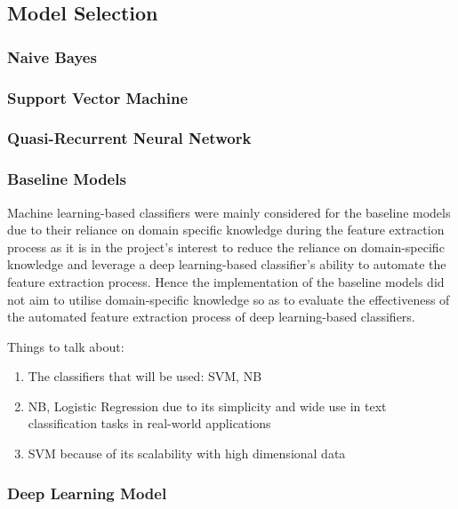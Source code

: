 \documentclass[a4paper,twoside,phd]{BYUPhys}
\begin{document}
\subsection{Model Selection}
\label{sec:ModelSelection}

\subsubsection{Naive Bayes}
\label{sec:ModelNB}

\subsubsection{Support Vector Machine}
\label{sec:ModelSVM}

\subsubsection{Quasi-Recurrent Neural Network}
\label{sec:ModelQRNN}


\subsubsection{Baseline Models}
\label{sec:BaselineModels}

Machine learning-based classifiers were mainly considered for the baseline models due to their reliance on domain specific knowledge during the feature extraction process as it is in the project's interest to reduce the reliance on domain-specific knowledge and leverage a deep learning-based classifier's ability to automate the feature extraction process. Hence the implementation of the baseline models did not aim to utilise domain-specific knowledge so as to evaluate the effectiveness of the automated feature extraction process of deep learning-based classifiers.

Things to talk about:
\begin{enumerate}
	\item The classifiers that will be used: SVM, NB
	\item NB, Logistic Regression due to its simplicity and wide use in text classification tasks in real-world applications
	\item SVM because of its scalability with high dimensional data

\end{enumerate}

\subsubsection{Deep Learning Model}
\label{sec:DLModels}
\end{document}
